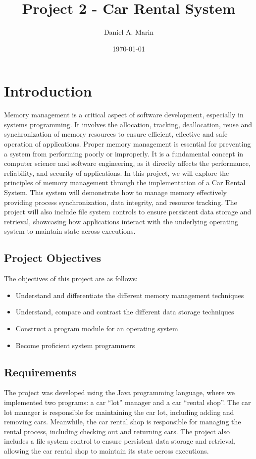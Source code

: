 \documentclass[conference]{IEEEtran}
\begin{document}
\title{Project 2 - Car Rental System}
\author{Daniel A. Marin}
\date{\today}

\maketitle

\section{Introduction}
Memory management is a critical aspect of software development, especially in systems programming. It involves the allocation, tracking, deallocation, reuse and synchronization of memory resources to ensure efficient, effective and safe operation of applications. Proper memory management is essential for preventing a system from performing poorly or improperly. It is a fundamental concept in computer science and software engineering, as it directly affects the performance, reliability, and security of applications. In this project, we will explore the principles of memory management through the implementation of a Car Rental System. This system will demonstrate how to manage memory effectively providing process synchronization, data integrity, and resource tracking. The project will also include file system controls to ensure persistent data storage and retrieval, showcasing how applications interact with the underlying operating system to maintain state across executions.

\subsection{Project Objectives}
The objectives of this project are as follows:
\begin{itemize}
    \item Understand and differentiate the different memory management techniques
    \item Understand, compare and contrast the different data storage techniques
    \item Construct a program module for an operating system 
    \item Become proficient system programmers
\end{itemize}

\subsection{Requirements}
The project was developed using the Java programming language, where we implemented two programs: a car ``lot'' manager and a car ``rental shop''. The car lot manager is responsible for maintaining the car lot, including adding and removing cars. Meanwhile, the car rental shop is responsible for managing the rental process, including checking out and returning cars. The project also includes a file system control to ensure persistent data storage and retrieval, allowing the car rental shop to maintain its state across executions. 
\end{document}
